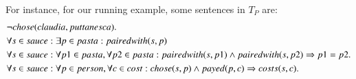 For instance, for our running example, some sentences in $T_P$ are: 
\begin{align*}
 &\lnot chose(claudia,puttanesca).\\
 & \forall s\in sauce : \exists p\in pasta : pairedwith(s,p)\\
 & \forall s\in sauce: \forall p1\in pasta, \forall p2\in pasta:  pairedwith(s,p1)\land pairedwith(s,p2)\Rightarrow p1=p2. \\
 & \forall s\in sauce: \forall p\in person, \forall c\in cost: chose(s,p)\land payed(p,c)\Rightarrow costs(s,c). 
\end{align*}



